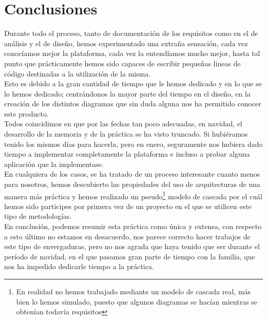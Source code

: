 \chapter{Conclusiones}
\lettrine[lines=1,slope=4pt,findent=0pt]{D}{}urante todo el proceso, tanto de documentación de los requisitos como en el de análisis y el de diseño, hemos experimentado una extraña sensación, cada vez conocíamos mejor la plataforma, cada vez la entendíamos mucho mejor, hasta tal punto que prácticamente hemos sido capaces de escribir pequeñas lineas de código destinadas a la utilización de la misma.\\

Esto es debido a la gran cantidad de tiempo que le hemos dedicado y en lo que se lo hemos dedicado; centrándonos la mayor parte del tiempo en el diseño, en la creación de los distintos diagramas que sin duda alguna nos ha permitido conocer este producto.\\

Todos coincidimos en que por las fechas tan poco adecuadas, en navidad, el desarrollo de la memoria y de la práctica se ha visto truncado. Si hubiéramos tenido los mismos días para hacerla, pero en enero, seguramente nos hubiera dado tiempo a implementar completamente la plataforma e incluso a probar alguna aplicación que la implementase.\\

En cualquiera de los casos, se ha tratado de un proceso interesante cuanto menos para nosotros, hemos descubierto las propiedades del uso de arquitecturas de una manera más práctica y hemos realizado un pseudo\footnote{En realidad no hemos trabajado mediante un modelo de cascada real, más bien lo hemos simulado, puesto que algunos diagramas se hacían mientras se obtenían todavía requisitos} modelo de cascada por el cuál hemos sido participes por primera vez de un proyecto en el que se utilicen este tipo de metodologías.\\

En conclusión, podemos resumir esta práctica como única y extensa, con respecto a esto último no estamos en desacuerdo, nos parece correcto hacer trabajos de este tipo de envergaduras, pero no nos agrada que haya tenido que ser durante el período de navidad, en el que pasamos gran parte de tiempo con la familia, que nos ha impedido dedicarle tiempo a la práctica.